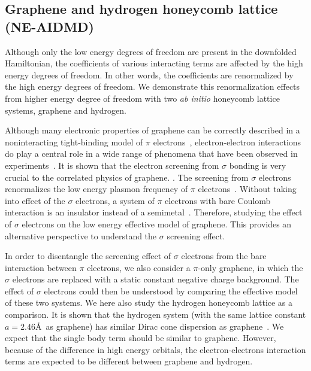 
\subsection{Graphene and hydrogen honeycomb lattice (NE-AIDMD)}
Although only the low energy degrees of freedom are present in the downfolded Hamiltonian, the coefficients of various interacting terms are affected by the high energy degrees of freedom. In other words, the coefficients are renormalized by the high energy degrees of freedom. We demonstrate this renormalization effects from higher energy degree of freedom with two \textit{ab initio} honeycomb lattice  systems, graphene and hydrogen. 

Although many electronic properties of graphene can be correctly described in a noninteracting tight-binding model of $\pi$ electrons~\cite{Castro2009}, electron-electron interactions do play a central role in a wide range of phenomena that have been observed in experiments~\cite{Kotov2012}. It is shown that the electron screening from $\sigma$ bonding is very crucial to the correlated physics of graphene. \cite{Zheng2016}. The screening from $\sigma$ electrons renormalizes the low energy plasmon frequency of $\pi$ electrons~\cite{Zheng2016}. Without taking into effect of the $\sigma$ electrons, a system of $\pi$ electrons with bare Coulomb interaction is an insulator instead of a semimetal~\cite{DrutPRL2009, DrutPRB2009,  Smith2014, Zheng2016}. Therefore, studying the effect of $\sigma$ electrons on the low energy effective model of graphene. This provides an alternative perspective to understand the $\sigma$ screening effect. 

In order to disentangle the screening effect of $\sigma$ electrons from the bare interaction between $\pi$ electrons, we also consider a $\pi$-only graphene, in which the $\sigma$ electrons are replaced with a static constant negative charge background. The effect of $\sigma$ electrons could then be understood by comparing the effective model of these two systems. 
We here also study the hydrogen honeycomb lattice as a comparison. It is shown that the hydrogen system (with the same lattice constant $a=2.46$\AA~as graphene) has similar Dirac cone dispersion as graphene~\cite{Zheng2016}. We expect that the single body term should be similar to graphene. However, because of the difference in high energy orbitals, the electron-electrons interaction terms are expected to be different between graphene and hydrogen. 

